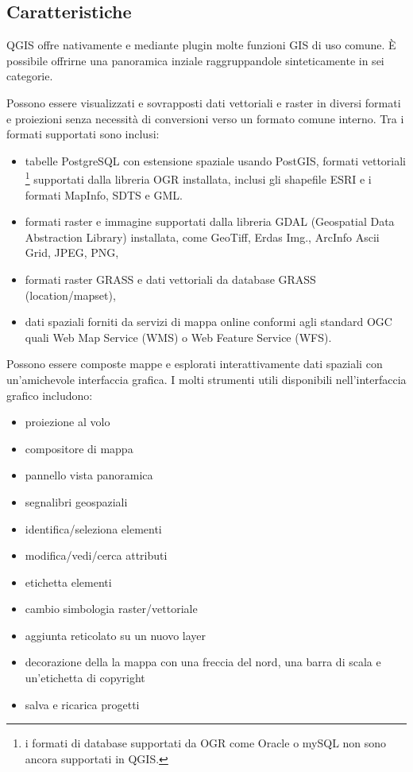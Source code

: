 \subsection{Caratteristiche}\label{label_majfeat}

QGIS offre nativamente e mediante plugin molte funzioni GIS di uso
comune. È possibile offrirne una panoramica inziale raggruppandole sinteticamente
in sei categorie.


Possono essere visualizzati e sovrapposti dati vettoriali e raster
in diversi formati e proiezioni senza necessità di conversioni verso un formato
comune interno. Tra i formati supportati sono inclusi:

\begin{itemize}
\item tabelle PostgreSQL con estensione spaziale usando PostGIS, formati vettoriali
\footnote{i formati di database supportati da OGR come Oracle o mySQL non sono 
ancora supportati in QGIS.} supportati dalla libreria OGR installata, inclusi gli
shapefile ESRI e i formati MapInfo, SDTS e GML.
\item formati raster e immagine supportati dalla libreria GDAL (Geospatial
Data Abstraction Library) installata, come GeoTiff, Erdas Img., ArcInfo
Ascii Grid, JPEG, PNG,
\item formati raster GRASS e dati vettoriali da database GRASS (location/mapset), 
\item dati spaziali forniti da servizi di mappa online conformi agli standard
OGC quali Web Map Service (WMS) o Web Feature Service (WFS).
\end{itemize}


Possono essere composte mappe e esplorati interattivamente dati spaziali
con un'amichevole interfaccia grafica. I molti strumenti utili disponibili
nell'interfaccia grafico includono:
\begin{itemize}
\item proiezione al volo
\item compositore di mappa
\item pannello vista panoramica 
\item segnalibri geospaziali 
\item identifica/seleziona elementi
\item modifica/vedi/cerca attributi
\item etichetta elementi
\item cambio simbologia raster/vettoriale
\item aggiunta reticolato su un nuovo layer 
\item decorazione della la mappa con una freccia del nord, una barra di scala e un'etichetta di copyright
\item salva e ricarica progetti
\end{itemize}

